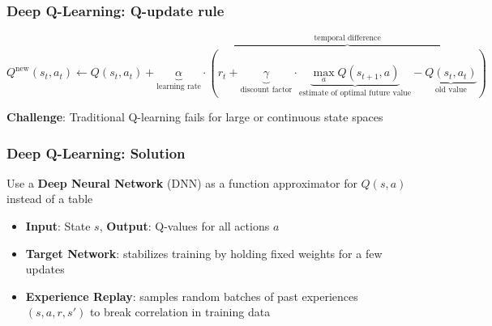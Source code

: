 \begin{frame}
	\frametitle{Deep Q-Learning: Q-update rule}
	\vspace{1cm}
		
			
		$$Q^{\text{new}}(s_t, a_t) \leftarrow Q(s_t, a_t) 
		+ \underbrace{\alpha}_{\text{learning rate}} \cdot 
		\overbrace{\left( r_t + \underbrace{\gamma}_{\text{discount factor}} 
		\cdot \underbrace{\max_a Q(s_{t+1}, a)}_{\text{estimate of optimal future value}} 
		- \underbrace{Q(s_t, a_t)}_{\text{old value}} \right)}^{\text{temporal difference}}$$
		
		\vspace{1cm}
		\pause
		\centering
		\textbf{Challenge}: Traditional Q-learning fails for large or continuous state spaces
\end{frame}

\begin{frame}
	\frametitle{Deep Q-Learning: Solution }
	\vspace{0.5cm}
	Use a \textbf{Deep Neural Network} (DNN) as a function approximator for $Q(s,a)$ instead of a table
		\begin{itemize}		
			\item  \textbf{Input}: State $s$, \textbf{Output}: Q-values for all actions $a$
			\item \textbf{Target Network}: stabilizes training by holding fixed weights for a few updates
			\item \textbf{Experience Replay}: samples random batches of past experiences $(s,a,r,s')$ to break correlation in training data
		\end{itemize}
\end{frame}


